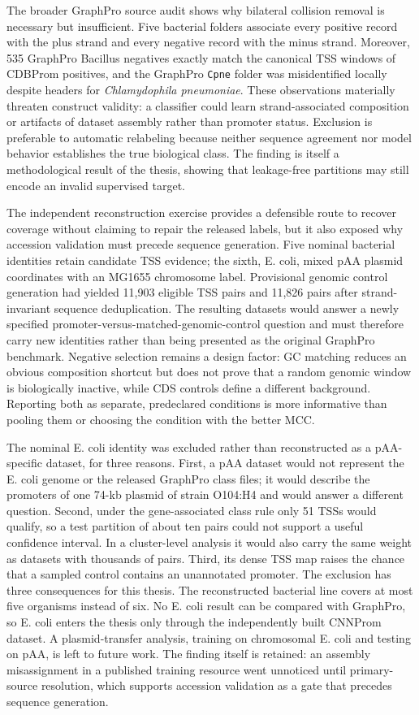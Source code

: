 The broader GraphPro source audit shows why bilateral collision removal is
necessary but insufficient. Five bacterial folders associate every positive
record with the plus strand and every negative record with the minus strand.
Moreover, 535 GraphPro Bacillus negatives exactly match the canonical TSS
windows of CDBProm positives, and the GraphPro \texttt{Cpne} folder was
misidentified locally despite headers for \textit{Chlamydophila pneumoniae}.
These observations materially threaten construct validity: a classifier could
learn strand-associated composition or artifacts of dataset assembly rather
than promoter status. Exclusion is preferable to automatic relabeling because
neither sequence agreement nor model behavior establishes the true biological
class. The finding is itself a methodological result of the thesis, showing
that leakage-free partitions may still encode an invalid supervised target.

The independent reconstruction exercise provides a defensible route to recover
coverage without claiming to repair the released labels, but it also exposed
why accession validation must precede sequence generation. Five nominal
bacterial identities retain candidate TSS evidence; the sixth, E. coli, mixed
pAA plasmid coordinates with an MG1655 chromosome label. Provisional genomic
control generation had yielded 11,903 eligible TSS pairs and 11,826 pairs after
strand-invariant sequence deduplication. The resulting
datasets would answer a newly specified promoter-versus-matched-genomic-control
question and must therefore carry new identities rather than being presented as
the original GraphPro benchmark. Negative selection remains a design factor:
GC matching reduces an obvious composition shortcut but does not prove that a
random genomic window is biologically inactive, while CDS controls define a
different background. Reporting both as separate, predeclared conditions is
more informative than pooling them or choosing the condition with the better
MCC.

The nominal E. coli identity was excluded rather than reconstructed as a
pAA-specific dataset, for three reasons. First, a pAA dataset would not
represent the E. coli genome or the released GraphPro class files; it would
describe the promoters of one 74-kb plasmid of strain O104:H4 and would answer
a different question. Second, under the gene-associated class rule only 51 TSSs
would qualify, so a test partition of about ten pairs could not support a
useful confidence interval. In a cluster-level analysis it would also carry the
same weight as datasets with thousands of pairs. Third, its dense TSS map
raises the chance that a sampled control contains an unannotated promoter. The
exclusion has three consequences for this thesis. The reconstructed bacterial
line covers at most five organisms instead of six. No E. coli result can be
compared with GraphPro, so E. coli enters the thesis only through the
independently built CNNProm dataset. A plasmid-transfer analysis, training on
chromosomal E. coli and testing on pAA, is left to future work. The finding
itself is retained: an assembly misassignment in a published training resource
went unnoticed until primary-source resolution, which supports accession
validation as a gate that precedes sequence generation.

